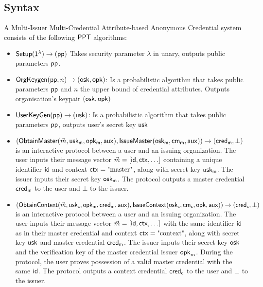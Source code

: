 \subsection{Syntax}
\begin{definition} A Multi-Issuer Multi-Credential Attribute-based Anonymous Credential system consists of the following $\mathsf{PPT}$ algorithms:
    \begin{itemize}
    \item $\mathsf{Setup}(\mathsf{1^{\lambda}}) \to (\mathsf{pp})$ Takes security parameter $\lambda$ in unary, outputs public parameters $\mathsf{pp}$.
    
    \item $\mathsf{OrgKeygen}(\mathsf{pp}, n) \to (\mathsf{osk}, \mathsf{opk})$: Is a probabilistic algorithm that takes public parameters $\mathsf{pp}$ and $n$ the upper bound of credential attributes. Outputs organisation's keypair $(\mathsf{osk}, \mathsf{opk})$
    
    \item $\mathsf{UserKeyGen}(\mathsf{pp}) \to (\mathsf{usk})$: Is a probabilistic algorithm that takes public parameters $\mathsf{pp}$, outputs user's secret key $\mathsf{usk}$
    
    \item $(\mathsf{ObtainMaster}(\vec{m}, \mathsf{usk_m}, \mathsf{opk_m}, \mathsf{aux}), \mathsf{IssueMaster}(\mathsf{osk_m}, \mathsf{cm_m}, \mathsf{aux})) \rightarrow (\mathsf{cred_m}, \bot)$ is an interactive protocol between a user and an issuing organization. The user inputs their message vector $\vec{m} = [\mathsf{id}, \mathsf{ctx}, \ldots]$ containing a unique identifier $\mathsf{id}$ and context $\mathsf{ctx} = \text{"master"}$, along with secret key $\mathsf{usk_m}$. The issuer inputs their secret key $\mathsf{osk_m}$. The protocol outputs a master credential $\mathsf{cred_m}$ to the user and $\bot$ to the issuer.
    
    \item $(\mathsf{ObtainContext}(\vec{m}, \mathsf{usk_c}, \mathsf{opk_m}, \mathsf{cred_m}, \mathsf{aux}), \mathsf{IssueContext}(\mathsf{osk_c}, \mathsf{cm_c}, \mathsf{opk}, \mathsf{aux})) \rightarrow (\mathsf{cred_c}, \bot)$ is an interactive protocol between a user and an issuing organization. The user inputs their message vector $\vec{m} = [\mathsf{id}, \mathsf{ctx}, \ldots]$ with the same identifier $\mathsf{id}$ as in their master credential and context $\mathsf{ctx} = \text{"context"}$, along with secret key $\mathsf{usk}$ and master credential $\mathsf{cred_m}$. The issuer inputs their secret key $\mathsf{osk}$ and the verification key of the master credential issuer $\mathsf{opk}_m$. During the protocol, the user proves possession of a valid master credential with the same $\mathsf{id}$. The protocol outputs a context credential $\mathsf{cred_c}$ to the user and $\bot$ to the issuer.
    

\end{itemize}
\end{definition}
